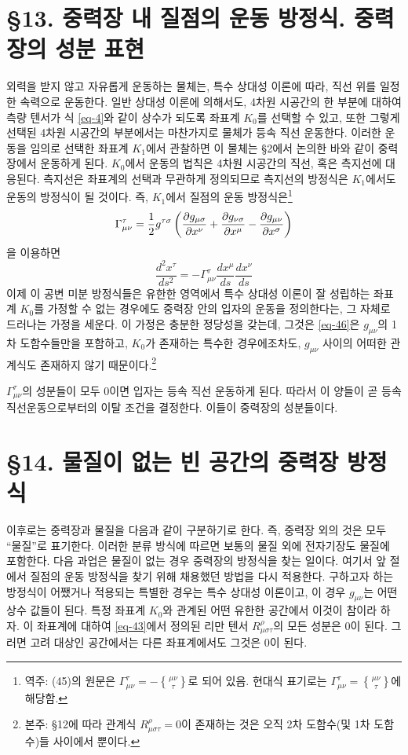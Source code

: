 \documentclass[b5paper]{article}
\begin{document}
\section*{\S 13. 중력장 내 질점의 운동 방정식. 중력장의 성분 표현}
외력을 받지 않고 자유롭게 운동하는 물체는, 특수 상대성 이론에 따라, 직선 위를 일정한 속력으로 운동한다. 일반 상대성 이론에 의해서도, 4차원 시공간의 한 부분에 대하여 측량 텐서가 식 \eqref{eq-4}와 같이 상수가 되도록 좌표계 $K_0$를 선택할 수 있고, 또한 그렇게 선택된 4차원 시공간의 부분에서는 마찬가지로 물체가 등속 직선 운동한다.
이러한 운동을 임의로 선택한 좌표계 $K_1$에서 관찰하면 이 물체는 \S 2에서 논의한 바와 같이 중력장에서 운동하게 된다. $K_0$에서 운동의 법칙은 4차원 시공간의 직선, 혹은 측지선에 대응된다. 측지선은 좌표계의 선택과 무관하게 정의되므로 측지선의 방정식은 $K_1$에서도 운동의 방정식이 될 것이다. 즉, $ K_1 $에서 질점의 운동 방정식은\footnote{역주: (45)의 원문은 $\Gamma_{\mu\nu}^{\tau}=-\genfrac\{\}{0pt}{1}{\mu\nu}{\tau}$로 되어 있음. 현대식 표기로는  $\Gamma_{\mu\nu}^{\tau}=\genfrac\{\}{0pt}{1}{\mu\nu}{\tau}$에 해당함.}
\begin{equation} \label{eq-45}
	\Gamma_{\mu\nu}^{\tau}=\frac{1}{2}g^{\tau\sigma}\left(
	{\frac{{\partial}{g_{\mu\sigma}}}{{\partial}{x^\nu}}}
	+ {\frac{{\partial}{g_{\nu\sigma}}}{{\partial}{x^\mu}}}
	- {\frac{{\partial}{g_{\mu\nu}}}{{\partial}{x^\sigma}}}
	\right)
\end{equation}
을 이용하면
\begin{equation} \label{eq-46}
	\frac{d^2 x^\tau}{ds^2}=-\Gamma_{\mu\nu}^{\tau}\frac{dx^\mu}{ds}\frac{dx^\nu}{ds}
\end{equation}
이제 이 공변 미분 방정식들은 유한한 영역에서 특수 상대성 이론이 잘 성립하는 좌표계 $ K_0 $를 가정할 수 없는 경우에도 중력장 안의 입자의 운동을 정의한다는,  그 자체로 드러나는 가정을 세운다. 이 가정은 충분한 정당성을 갖는데, 그것은 \eqref{eq-46}은 $g_{\mu\nu}$의 1차 도함수들만을 포함하고, $ K_0 $가 존재하는 특수한 경우에조차도, $g_{\mu\nu}$ 사이의 어떠한 관계식도 존재하지 않기 때문이다.\footnote{본주: \S 12에 따라 관계식 $R_{\mu\sigma\tau}^{\rho}=0$이 존재하는 것은 오직 2차 도함수(및 1차 도함수)들 사이에서 뿐이다.}

$\Gamma_{\mu\nu}^{\tau}$의 성분들이 모두 0이면 입자는 등속 직선 운동하게 된다. 따라서 이 양들이 곧 등속 직선운동으로부터의 이탈 조건을 결정한다. 이들이 중력장의 성분들이다.

\section*{\S 14. 물질이 없는 빈 공간의 중력장 방정식}
이후로는 중력장과 물질을 다음과 같이 구분하기로 한다. 즉, 중력장 외의 것은 모두 ``물질''로 표기한다. 이러한 분류 방식에 따르면 보통의 물질 외에 전자기장도 물질에 포함한다.
다음 과업은 물질이 없는 경우 중력장의 방정식을 찾는 일이다. 여기서 앞 절에서 질점의 운동 방정식을 찾기 위해 채용했던  방법을 다시 적용한다. 구하고자 하는 방정식이 어쨌거나 적용되는 특별한 경우는 특수 상대성 이론이고, 이 경우 $g_{\mu\nu}$는 어떤 상수 값들이 된다.
특정 좌표계 $K_0$와 관계된 어떤 유한한 공간에서 이것이 참이라 하자. 이 좌표계에 대하여 \eqref{eq-43}에서 정의된 리만 텐서 $R_{\mu\sigma\tau}^{\rho}$의 모든 성분은 0이 된다. 그러면 고려 대상인 공간에서는 다른 좌표계에서도 그것은 0이 된다.
\end{document}

